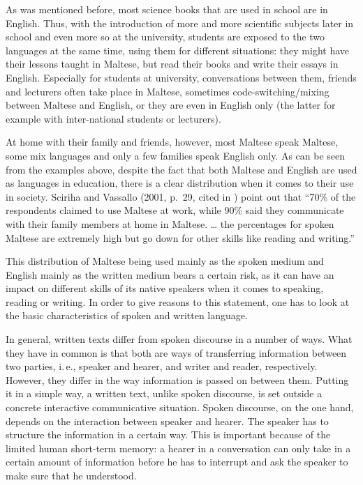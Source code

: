 \begin{multicols}{2}
As was mentioned before, most science books that are used in school are in English. Thus, with the introduction of more and more scientific subjects later in school and even more so at the university, students are exposed to the two languages at the same time, using them for different situations: they might have their lessons taught in Maltese, but read their books and write their essays in English. Especially for students at university, conversations between them, friends and lecturers often take place in Maltese, sometimes code-switching/mixing between Maltese and English, or they are even in English only (the latter for example with inter-national students or lecturers).

At home with their family and friends, however, most Maltese speak Maltese, some mix languages and only a few families speak English only. 
%
As can be seen from the examples above, despite the fact that both Maltese and English are used as languages in education, there is a clear distribution when it comes to their use in society. Sciriha and Vassallo (2001, p.~29, cited in \cite{Fabri:2011a}) point out that ``70\% of the respondents claimed to use Maltese at work, while 90\% said they communicate with their family members at home in Maltese. … the percentages for spoken Maltese are extremely high but go down for other skills like reading and writing.''

This distribution of Maltese being used mainly as the spoken medium and English mainly as the written medium bears a certain risk, as it can have an impact on different skills of its native speakers when it comes to speaking, reading or writing. In order to give reasons to this statement, one has to look at the basic characteristics of spoken and written language.

In general, written texts differ from spoken discourse in a number of ways. What they have in common is that both are ways of transferring information between two parties, i.\,e., speaker and hearer, and writer and reader, respectively. However, they differ in the way information is passed on between them. Putting it in a simple way, a written text, unlike spoken discourse, is set outside a concrete interactive communicative situation. Spoken discourse, on the one hand, depends on the interaction between speaker and hearer. The speaker has to structure the information in a certain way. This is important because of the limited human short-term memory: a hearer in a conversation can only take in a certain amount of information before he has to interrupt and ask the speaker to make sure that he understood. 


\end{multicols}
